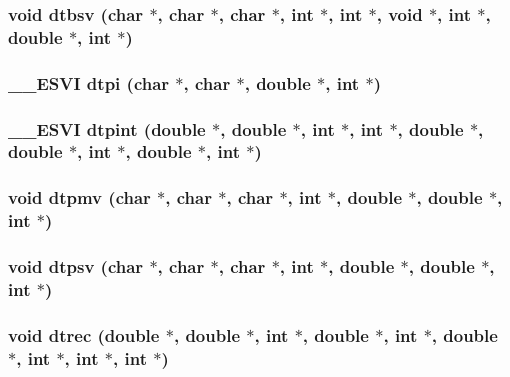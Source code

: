 \subsubsection{\setlength{\rightskip}{0pt plus 5cm}void dtbsv (char $\ast$, char $\ast$, char $\ast$, int $\ast$, int $\ast$, void $\ast$, int $\ast$, double $\ast$, int $\ast$)}\label{essl_8h_4ddae8c09f9fbaa063176484c4d236bb}


\subsubsection{\setlength{\rightskip}{0pt plus 5cm}\_\-\_\-ESVI dtpi (char $\ast$, char $\ast$, double $\ast$, int $\ast$)}\label{essl_8h_b4c468b964f127128e24a655be632de7}


\subsubsection{\setlength{\rightskip}{0pt plus 5cm}\_\-\_\-ESVI dtpint (double $\ast$, double $\ast$, int $\ast$, int $\ast$, double $\ast$, double $\ast$, int $\ast$, double $\ast$, int $\ast$)}\label{essl_8h_525a9523b637dc2b1d45b9ca5f451791}


\subsubsection{\setlength{\rightskip}{0pt plus 5cm}void dtpmv (char $\ast$, char $\ast$, char $\ast$, int $\ast$, double $\ast$, double $\ast$, int $\ast$)}\label{essl_8h_a6dcf3b1e19a69b7fea509a1aaa9d0a3}


\subsubsection{\setlength{\rightskip}{0pt plus 5cm}void dtpsv (char $\ast$, char $\ast$, char $\ast$, int $\ast$, double $\ast$, double $\ast$, int $\ast$)}\label{essl_8h_5edd542dcceb8f8b7e557137cc2ec282}


\subsubsection{\setlength{\rightskip}{0pt plus 5cm}void dtrec (double $\ast$, double $\ast$, int $\ast$, double $\ast$, int $\ast$, double $\ast$, int $\ast$, int $\ast$, int $\ast$)}\label{essl_8h_43e6ba4f795f5f49f42e84ebfcf3ed27}


